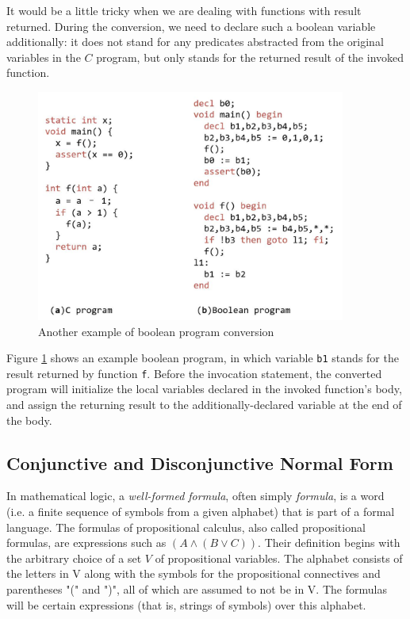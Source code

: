 It would be a little tricky when we are dealing with functions with result returned. During the conversion, we need to declare such a boolean variable additionally: it does not stand for any predicates abstracted from the original variables in the $C$ program, but only stands for the returned result of the invoked function.

\begin{figure}
\centering
\includegraphics[width=4in,height=3in]{Fig2-3.jpg}
\caption{Another example of boolean program conversion}
\label{fig:BPC_1}
\end{figure}

Figure \ref{fig:BPC_1} shows an example boolean program, in which variable \lstinline|b1| stands for the result returned by function \lstinline|f|.
Before the invocation statement, the converted program will initialize the local variables declared in the invoked function's body, and assign the returning result to the additionally-declared variable at the end of the body.

\subsection{Conjunctive and Disconjunctive Normal Form}
\label{section:CNF_DNF}
In mathematical logic, a \textit{well-formed formula}, often simply \textit{formula}, is a word (i.e. a finite sequence of symbols from a given alphabet) that is part of a formal language.
The formulas of propositional calculus, also called propositional formulas\cite{FOLaATP}, are expressions such as $(A \wedge (B \vee C))$. Their definition begins with the arbitrary choice of a set $V$ of propositional variables. The alphabet consists of the letters in V along with the symbols for the propositional connectives and parentheses "(" and ")", all of which are assumed to not be in V. The formulas will be certain expressions (that is, strings of symbols) over this alphabet.

